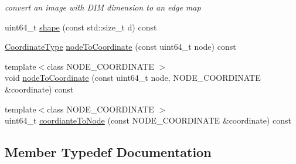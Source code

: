 \begin{DoxyCompactItemize}
\begin{DoxyCompactList}\small\item\em convert an image with D\+I\+M dimension to an edge map \end{DoxyCompactList}\item 
uint64\+\_\+t \hyperlink{classnifty_1_1graph_1_1UndirectedGridGraph_3_01DIM_00_01true_01_4_aae07f158c9e01de28f520a587a92e4e0}{shape} (const std\+::size\+\_\+t d) const 
\item 
\hyperlink{classnifty_1_1graph_1_1UndirectedGridGraph_3_01DIM_00_01true_01_4_a45f38cce72559c7bdefa3d219486bae4}{Coordinate\+Type} \hyperlink{classnifty_1_1graph_1_1UndirectedGridGraph_3_01DIM_00_01true_01_4_a45f6130be3a7c3ae896018a551203c93}{node\+To\+Coordinate} (const uint64\+\_\+t node) const 
\item 
{\footnotesize template$<$class N\+O\+D\+E\+\_\+\+C\+O\+O\+R\+D\+I\+N\+A\+T\+E $>$ }\\void \hyperlink{classnifty_1_1graph_1_1UndirectedGridGraph_3_01DIM_00_01true_01_4_ae735eb56076d4d656d318474807fc51a}{node\+To\+Coordinate} (const uint64\+\_\+t node, N\+O\+D\+E\+\_\+\+C\+O\+O\+R\+D\+I\+N\+A\+T\+E \&coordinate) const 
\item 
{\footnotesize template$<$class N\+O\+D\+E\+\_\+\+C\+O\+O\+R\+D\+I\+N\+A\+T\+E $>$ }\\uint64\+\_\+t \hyperlink{classnifty_1_1graph_1_1UndirectedGridGraph_3_01DIM_00_01true_01_4_ae0bd0ad13f12c2d52089863bc5c09bf1}{coordiante\+To\+Node} (const N\+O\+D\+E\+\_\+\+C\+O\+O\+R\+D\+I\+N\+A\+T\+E \&coordinate) const 
\end{DoxyCompactItemize}


\subsection{Member Typedef Documentation}
\hypertarget{classnifty_1_1graph_1_1UndirectedGridGraph_3_01DIM_00_01true_01_4_a9779969eb8762908d43eab3d9d3b17b1}{}
